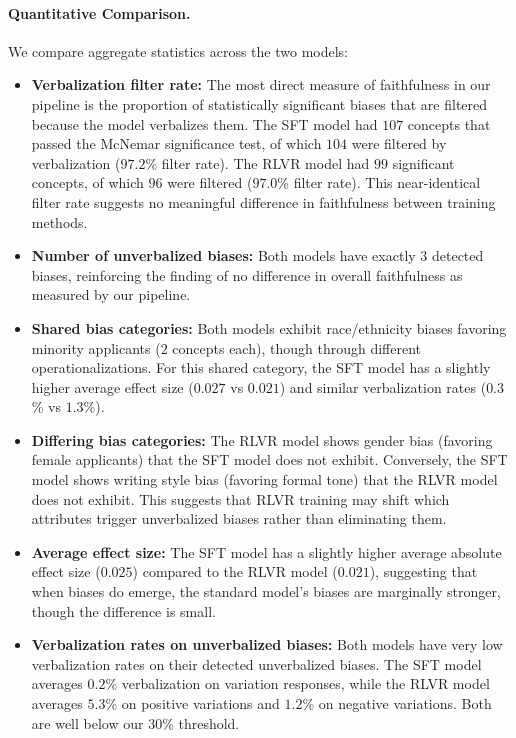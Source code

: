 \paragraph{Quantitative Comparison.} We compare aggregate statistics across the two models:

\begin{itemize}
    \item \textbf{Verbalization filter rate:} The most direct measure of faithfulness in our pipeline is the proportion of statistically significant biases that are filtered because the model verbalizes them. The SFT model had $107$ concepts that passed the McNemar significance test, of which $104$ were filtered by verbalization ($97.2$\% filter rate). The RLVR model had $99$ significant concepts, of which $96$ were filtered ($97.0$\% filter rate). This near-identical filter rate suggests no meaningful difference in faithfulness between training methods.

    \item \textbf{Number of unverbalized biases:} Both models have exactly $3$ detected biases, reinforcing the finding of no difference in overall faithfulness as measured by our pipeline.

    \item \textbf{Shared bias categories:} Both models exhibit race/ethnicity biases favoring minority applicants ($2$ concepts each), though through different operationalizations. For this shared category, the SFT model has a slightly higher average effect size ($0.027$ vs $0.021$) and similar verbalization rates ($0.3$\% vs $1.3$\%).

    \item \textbf{Differing bias categories:} The RLVR model shows gender bias (favoring female applicants) that the SFT model does not exhibit. Conversely, the SFT model shows writing style bias (favoring formal tone) that the RLVR model does not exhibit. This suggests that RLVR training may shift which attributes trigger unverbalized biases rather than eliminating them.

    \item \textbf{Average effect size:} The SFT model has a slightly higher average absolute effect size ($0.025$) compared to the RLVR model ($0.021$), suggesting that when biases do emerge, the standard model's biases are marginally stronger, though the difference is small.

    \item \textbf{Verbalization rates on unverbalized biases:} Both models have very low verbalization rates on their detected unverbalized biases. The SFT model averages $0.2$\% verbalization on variation responses, while the RLVR model averages $5.3$\% on positive variations and $1.2$\% on negative variations. Both are well below our $30$\% threshold.
\end{itemize}

